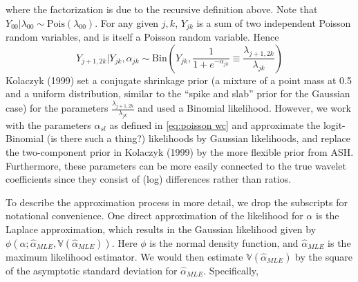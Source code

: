 \documentclass[12pt]{article}
\newcommand{\Ga}{\alpha}
\newcommand{\Gl}{\lambda}    \newcommand{\GL}{\Lambda}
\begin{document}
where the factorization is due to the recursive definition above. Note that $Y_{00}|\Gl_{00}\sim \textrm{Pois}(\Gl_{00})$. For any given $j,k$, $Y_{jk}$ is a sum of two independent Poisson random variables, and is itself a Poisson random variable. Hence
\[Y_{j+1,2k}|Y_{jk},\Ga_{jk}\sim \textrm{Bin}({Y_{jk},\frac{1}{1+e^{-\Ga_{jk}}}\equiv\frac{\Gl_{j+1,2k}}{\Gl_{jk}}})\]
Kolaczyk (1999) set a conjugate shrinkage prior (a mixture of a point mass at 0.5 and a uniform distribution, similar to the ``spike and slab'' prior for the Gaussian case) for the parameters $\frac{\Gl_{j+1,2k}}{\Gl_{jk}}$ and used a Binomial likelihood. However, we work with the parameters $\Ga_{sl}$ as defined in \eqref{eq:poisson wc} and approximate the logit-Binomial (is there such a thing?) likelihoods by Gaussian likelihoods, and replace the two-component prior in Kolaczyk (1999) by the more flexible prior from ASH. Furthermore, these parameters can be more easily connected to the true wavelet coefficients since they consist of (log) differences rather than ratios.

To describe the approximation process in more detail, we drop the subscripts for notational convenience. One direct approximation of the likelihood for $\Ga$ is the Laplace approximation, which results in the Gaussian likelihood given by $\phi(\Ga;\hat{\Ga}_{MLE},\mathbb{V}(\hat{\Ga}_{MLE}))$. Here $\phi$ is the normal density function, and $\hat{\Ga}_{MLE}$ is the maximum likelihood estimator. We would then estimate $\mathbb{V}(\hat{\Ga}_{MLE})$ by the square of the asymptotic standard deviation for $\hat{\Ga}_{MLE}$. Specifically,
\end{document}
